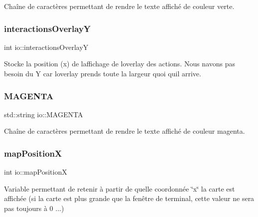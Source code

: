 Chaîne de caractères permettant de rendre le texte affiché de couleur verte. 

\mbox{\label{namespaceio_af6147c2896f77caaa4c7d26daee44ac5}} 
\subsubsection{\texorpdfstring{interactions\+OverlayY}{interactionsOverlayY}}
{\footnotesize\ttfamily int io\+::interactions\+OverlayY}



Stocke la position (x) de l\textquotesingle{}affichage de l\textquotesingle{}overlay des actions. Nous n\textquotesingle{}avons pas besoin du Y car l\textquotesingle{}overlay prends toute la largeur quoi qu\textquotesingle{}il arrive. 

\mbox{\label{namespaceio_a1e4a43cea85f576e62aebce6aabc60b5}} 
\subsubsection{\texorpdfstring{M\+A\+G\+E\+N\+TA}{MAGENTA}}
{\footnotesize\ttfamily std\+::string io\+::\+M\+A\+G\+E\+N\+TA}



Chaîne de caractères permettant de rendre le texte affiché de couleur magenta. 

\mbox{\label{namespaceio_a7f2af984af03881a45da957db2c48be2}} 
\subsubsection{\texorpdfstring{map\+PositionX}{mapPositionX}}
{\footnotesize\ttfamily int io\+::map\+PositionX}



Variable permettant de retenir à partir de quelle coordonnée \char`\"{}x\char`\"{} la carte est affichée (si la carte est plus grande que la fenêtre de terminal, cette valeur ne sera pas toujours à 0 ...) 

\mbox{\label{namespaceio_aa0322ffa705df7bd3c4fa5eaefde5d6d}} 
